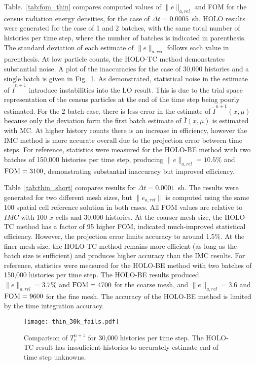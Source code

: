 Table.~\ref{tab:fom_thin} compares computed values of $\|e\|_{a,rel}$ and FOM for the census
radiation energy densities, for the case of $\Delta t =0.0005$~sh.   HOLO results were generated for the case of 1 and 2 batches, with the same
total number of histories per time step, where the number of batches is indicated in
parenthesis. The standard deviation of each estimate of $\|e\|_{a,rel}$ follows each value in parenthesis. 
At low particle counts, the HOLO-TC method demonstrates substantial noise.   
A plot
of the inaccuracies for the case of 30,000 histories and a single batch is given in
Fig.~\ref{fig:30k_fails}.  As demonstrated, statistical noise in the estimate of
$\tilde I^{n+1}$ introduce instabilities into the LO result.
This is due to the trial space representation of the
census particles at the end of the time step being poorly estimated.  For the 2 batch
case, there is less error in the estimate of $\tilde I^{n+1}(x,\mu)$ because only the
deviation form the first batch estimate of $\overline I(x,\mu)$ is estimated with MC. 
At higher history counts there is an increase in efficiency, however the IMC method is
more accurate overall due to the projection error between time steps.  For reference, statistics were measured for the HOLO-BE method with two batches of 150,000
histories per time step, producing $\|e\|_{a,rel}=10.5\%$ and $\text{FOM}=3100$, demonstrating
substantial inaccuracy but improved efficiency.

Table~\ref{tab:thin_short} compares results for $\Delta t = 0.0001$~sh.  The results were
generated for two different mesh sizes, but $\|e_{a,rel}\|$ is computed using the same 100
spatial cell reference solution in both cases.  All FOM values are relative to $IMC$ with
100 $x$ cells and 30,000 histories.  At the coarser mesh size, the HOLO-TC method has a
factor of 95 higher FOM, indicated much-improved statistical efficiency.  However, the projection error
limits accuracy to around 1.5$\%$.  At the finer mesh size, the
HOLO-TC method remains more efficient (as long as the batch size is sufficient) and produces higher accuracy than the IMC results.
For reference, statistics were measured for the HOLO-BE method with two batches of 150,000
histories per time step. The HOLO-BE results produced $\|e\|_{a,rel}=3.7\%$ and $\text{FOM}=4700$ for the
coarse mesh, and $\|e\|_{a,rel}=3.6$ and $\text{FOM}=9600$ for the fine mesh.  The accuracy of the HOLO-BE method
is limited by the time integration accuracy.
\begin{figure}
    \centering
    \texttt{[image: thin\_30k\_fails.pdf]}
    \caption{\label{fig:30k_fails}Comparison of $T_{r}^{n+1}$ for 30,000 histories per time step.  The HOLO-TC result has inssuficient
histories to accurately estimate end of time step unknowns.}
\end{figure}

